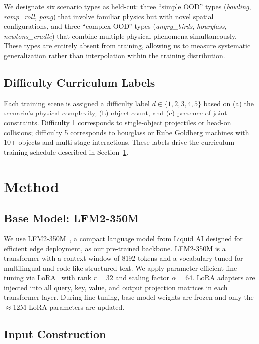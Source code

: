 \documentclass{article}
\begin{document}
We designate six scenario types as held-out: three ``simple OOD'' types
(\textit{bowling}, \textit{ramp\_roll}, \textit{pong}) that involve familiar physics
but with novel spatial configurations, and three ``complex OOD'' types
(\textit{angry\_birds}, \textit{hourglass}, \textit{newtons\_cradle}) that combine
multiple physical phenomena simultaneously. These types are entirely absent from
training, allowing us to measure systematic generalization rather than
interpolation within the training distribution.

\subsection{Difficulty Curriculum Labels}

Each training scene is assigned a difficulty label $d \in \{1, 2, 3, 4, 5\}$
based on (a) the scenario's physical complexity, (b) object count, and (c) presence
of joint constraints. Difficulty 1 corresponds to single-object projectiles or
head-on collisions; difficulty 5 corresponds to hourglass or Rube Goldberg
machines with 10+ objects and multi-stage interactions. These labels drive the
curriculum training schedule described in Section~\ref{sec:method}.

\section{Method}
\label{sec:method}

\subsection{Base Model: LFM2-350M}

We use LFM2-350M~\citep{liquideai2024lfm2}, a compact language model from Liquid AI
designed for efficient edge deployment, as our pre-trained backbone. LFM2-350M is
a transformer with a context window of 8192 tokens and a vocabulary tuned for
multilingual and code-like structured text. We apply parameter-efficient fine-tuning
via LoRA~\citep{hu2022lora} with rank $r = 32$ and scaling factor $\alpha = 64$.
LoRA adapters are injected into all query, key, value, and output projection
matrices in each transformer layer. During fine-tuning, base model weights are
frozen and only the $\approx$12M LoRA parameters are updated.

\subsection{Input Construction}
\end{document}
